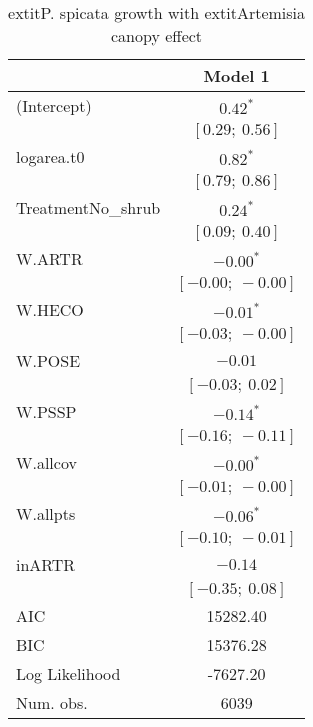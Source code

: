\begin{table}
\caption{	extit{P. spicata} growth with 	extit{Artemisia} canopy effect}
\begin{center}
\begin{tabular}{l c }
\hline
 & Model 1 \\
\hline
(Intercept)                      & $0.42^{*}$        \\
                                 & $[0.29;\ 0.56]$   \\
logarea.t0                       & $0.82^{*}$        \\
                                 & $[0.79;\ 0.86]$   \\
TreatmentNo\_shrub               & $0.24^{*}$        \\
                                 & $[0.09;\ 0.40]$   \\
W.ARTR                           & $-0.00^{*}$       \\
                                 & $[-0.00;\ -0.00]$ \\
W.HECO                           & $-0.01^{*}$       \\
                                 & $[-0.03;\ -0.00]$ \\
W.POSE                           & $-0.01$           \\
                                 & $[-0.03;\ 0.02]$  \\
W.PSSP                           & $-0.14^{*}$       \\
                                 & $[-0.16;\ -0.11]$ \\
W.allcov                         & $-0.00^{*}$       \\
                                 & $[-0.01;\ -0.00]$ \\
W.allpts                         & $-0.06^{*}$       \\
                                 & $[-0.10;\ -0.01]$ \\
inARTR                           & $-0.14$           \\
                                 & $[-0.35;\ 0.08]$  \\
\hline
AIC                              & 15282.40          \\
BIC                              & 15376.28          \\
Log Likelihood                   & -7627.20          \\
Num. obs.                        & 6039              \\

\end{tabular}
\end{center}
\end{table}
